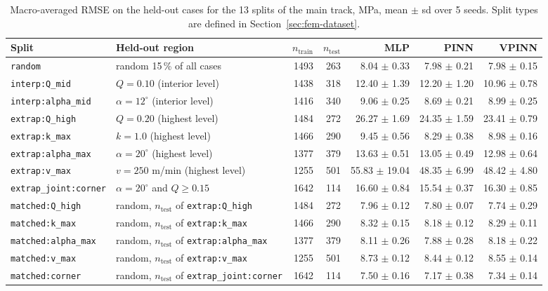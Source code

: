 \documentclass[subscriptcorrection,upint,varvw,barcolor=Goldenrod3,mathalfa=cal=euler,balance,hyphenate,french,pdf-a]{asmejour} %
\begin{document}
\begin{table}[htbp]
\centering
\caption{Macro-averaged RMSE on the held-out cases for the 13 splits of the main track, MPa, mean $\pm$ sd over 5 seeds. Split types are defined in Section~\ref{sec:fem-dataset}.}
\label{tab:main}
\small
\begin{tabular}{@{}llrrrrr@{}}
\toprule
Split & Held-out region & $n_\mathrm{train}$ & $n_\mathrm{test}$ & MLP & PINN & VPINN \\
\midrule
\texttt{random} & random 15\,\% of all cases & 1493 & 263 & 8.04 $\pm$ 0.33 & 7.98 $\pm$ 0.21 & 7.98 $\pm$ 0.15 \\
\addlinespace
\texttt{interp:Q\_mid} & $Q = 0.10$ (interior level) & 1438 & 318 & 12.40 $\pm$ 1.39 & 12.20 $\pm$ 1.20 & 10.96 $\pm$ 0.78 \\
\texttt{interp:alpha\_mid} & $\alpha = 12^\circ$ (interior level) & 1416 & 340 & 9.06 $\pm$ 0.25 & 8.69 $\pm$ 0.21 & 8.99 $\pm$ 0.25 \\
\addlinespace
\texttt{extrap:Q\_high} & $Q = 0.20$ (highest level) & 1484 & 272 & 26.27 $\pm$ 1.69 & 24.35 $\pm$ 1.59 & 23.41 $\pm$ 0.79 \\
\texttt{extrap:k\_max} & $k = 1.0$ (highest level) & 1466 & 290 & 9.45 $\pm$ 0.56 & 8.29 $\pm$ 0.38 & 8.98 $\pm$ 0.16 \\
\texttt{extrap:alpha\_max} & $\alpha = 20^\circ$ (highest level) & 1377 & 379 & 13.63 $\pm$ 0.51 & 13.05 $\pm$ 0.49 & 12.98 $\pm$ 0.64 \\
\texttt{extrap:v\_max} & $v = 250$ m/min (highest level) & 1255 & 501 & 55.83 $\pm$ 19.04 & 48.35 $\pm$ 6.99 & 48.42 $\pm$ 4.80 \\
\addlinespace
\texttt{extrap\_joint:corner} & $\alpha = 20^\circ$ and $Q \ge 0.15$ & 1642 & 114 & 16.60 $\pm$ 0.84 & 15.54 $\pm$ 0.37 & 16.30 $\pm$ 0.85 \\
\addlinespace
\texttt{matched:Q\_high} & random, $n_\mathrm{test}$ of \texttt{extrap:Q\_high} & 1484 & 272 & 7.96 $\pm$ 0.12 & 7.80 $\pm$ 0.07 & 7.74 $\pm$ 0.29 \\
\texttt{matched:k\_max} & random, $n_\mathrm{test}$ of \texttt{extrap:k\_max} & 1466 & 290 & 8.32 $\pm$ 0.15 & 8.18 $\pm$ 0.12 & 8.29 $\pm$ 0.11 \\
\texttt{matched:alpha\_max} & random, $n_\mathrm{test}$ of \texttt{extrap:alpha\_max} & 1377 & 379 & 8.11 $\pm$ 0.26 & 7.88 $\pm$ 0.28 & 8.18 $\pm$ 0.22 \\
\texttt{matched:v\_max} & random, $n_\mathrm{test}$ of \texttt{extrap:v\_max} & 1255 & 501 & 8.73 $\pm$ 0.12 & 8.44 $\pm$ 0.12 & 8.55 $\pm$ 0.14 \\
\texttt{matched:corner} & random, $n_\mathrm{test}$ of \texttt{extrap\_joint:corner} & 1642 & 114 & 7.50 $\pm$ 0.16 & 7.17 $\pm$ 0.38 & 7.34 $\pm$ 0.14 \\
\bottomrule
\end{tabular}
\end{table}
\end{document}

